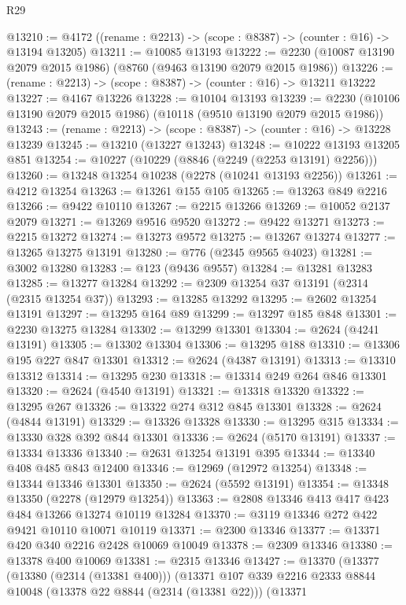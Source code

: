 \begin{lexlean}{R29}
\begin{coremodule}
@13210 := @4172 ((rename : @2213) -> (scope : @8387) -> (counter : @16) -> @13194 @13205)
@13211 := @10085 @13193
@13222 := @2230 (@10087 @13190 @2079 @2015 @1986) (@8760 (@9463 @13190 @2079 @2015 @1986))
@13226 := (rename : @2213) -> (scope : @8387) -> (counter : @16) -> @13211 @13222
@13227 := @4167 @13226
@13228 := @10104 @13193
@13239 := @2230 (@10106 @13190 @2079 @2015 @1986) (@10118 (@9510 @13190 @2079 @2015 @1986))
@13243 := (rename : @2213) -> (scope : @8387) -> (counter : @16) -> @13228 @13239
@13245 := @13210 (@13227 @13243)
@13248 := @10222 @13193 @13205 @851
@13254 := @10227 (@10229 (@8846 (@2249 (@2253 @13191) @2256)))
@13260 := @13248 @13254 @10238 (@2278 (@10241 @13193 @2256))
@13261 := @4212 @13254
@13263 := @13261 @155 @105
@13265 := @13263 @849 @2216
@13266 := @9422 @10110
@13267 := @2215 @13266
@13269 := @10052 @2137 @2079
@13271 := @13269 @9516 @9520
@13272 := @9422 @13271
@13273 := @2215 @13272
@13274 := @13273 @9572
@13275 := @13267 @13274
@13277 := @13265 @13275 @13191
@13280 := @776 (@2345 @9565 @4023)
@13281 := @3002 @13280
@13283 := @123 (@9436 @9557)
@13284 := @13281 @13283
@13285 := @13277 @13284
@13292 := @2309 @13254 @37 @13191 (@2314 (@2315 @13254 @37))
@13293 := @13285 @13292
@13295 := @2602 @13254 @13191
@13297 := @13295 @164 @89
@13299 := @13297 @185 @848
@13301 := @2230 @13275 @13284
@13302 := @13299 @13301
@13304 := @2624 (@4241 @13191)
@13305 := @13302 @13304
@13306 := @13295 @188
@13310 := @13306 @195 @227 @847 @13301
@13312 := @2624 (@4387 @13191)
@13313 := @13310 @13312
@13314 := @13295 @230
@13318 := @13314 @249 @264 @846 @13301
@13320 := @2624 (@4540 @13191)
@13321 := @13318 @13320
@13322 := @13295 @267
@13326 := @13322 @274 @312 @845 @13301
@13328 := @2624 (@4844 @13191)
@13329 := @13326 @13328
@13330 := @13295 @315
@13334 := @13330 @328 @392 @844 @13301
@13336 := @2624 (@5170 @13191)
@13337 := @13334 @13336
@13340 := @2631 @13254 @13191 @395
@13344 := @13340 @408 @485 @843 @12400
@13346 := @12969 (@12972 @13254)
@13348 := @13344 @13346 @13301
@13350 := @2624 (@5592 @13191)
@13354 := @13348 @13350 (@2278 (@12979 @13254))
@13363 := @2808 @13346 @413 @417 @423 @484 @13266 @13274 @10119 @13284
@13370 := @3119 @13346 @272 @422 @9421 @10110 @10071 @10119
@13371 := @2300 @13346
@13377 := @13371 @420 @340 @2216 @2428 @10069 @10049
@13378 := @2309 @13346
@13380 := @13378 @400 @10069
@13381 := @2315 @13346
@13427 := @13370
    (@13377
      (@13380 (@2314 (@13381 @400)))
      (@13371
        @107
        @339
        @2216
        @2333
        @8844
        @10048
        (@13378 @22 @8844 (@2314 (@13381 @22)))
        (@13371

\end{coremodule}
\end{lexlean}
